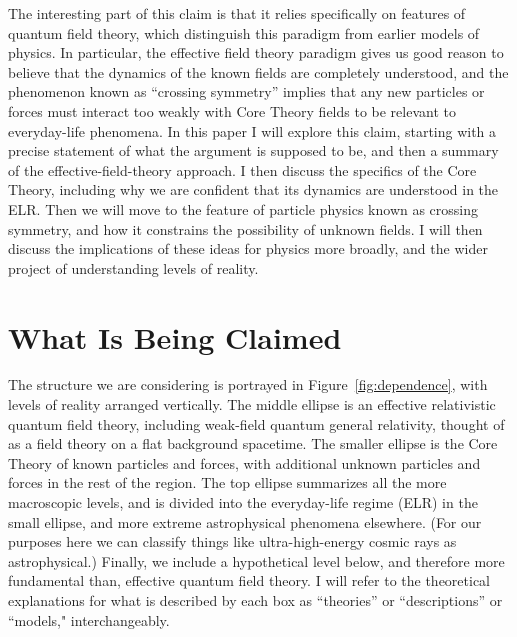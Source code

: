 \documentclass[12pt,letterpaper]{article}
\begin{document}
 The interesting part of this claim is that it relies specifically on features of quantum field theory, which distinguish this paradigm from earlier models of physics.
 In particular, the effective field theory paradigm gives us good reason to believe that the dynamics of the known fields are completely understood, and the phenomenon known as ``crossing symmetry'' implies that any new particles or forces must interact too weakly with Core Theory fields to be relevant to everyday-life phenomena.
 In this paper I will explore this claim, starting with a precise statement of what the argument is supposed to be, and then a summary of the effective-field-theory approach. 
 I then discuss the specifics of the Core Theory, including why we are confident that its dynamics are understood in the ELR.
Then we will move to the feature of particle physics known as crossing symmetry, and how it constrains the possibility of unknown fields.
 I will then discuss the implications of these ideas for physics more broadly, and the wider project of understanding levels of reality.


\section{What Is Being Claimed}


The structure we are considering is portrayed in Figure~\ref{fig:dependence}, with levels of reality arranged vertically.
The middle ellipse is an effective relativistic quantum field theory, including weak-field quantum general relativity, thought of as a field theory on a flat background spacetime.
The smaller ellipse is the Core Theory of known particles and forces, with additional unknown particles and forces in the rest of the region.
The top ellipse summarizes all the more macroscopic levels, and is divided into the everyday-life regime (ELR) in the small ellipse, and more extreme astrophysical phenomena elsewhere.
(For our purposes here we can classify things like ultra-high-energy cosmic rays as astrophysical.)
Finally, we include a hypothetical level below, and therefore more fundamental than, effective quantum field theory.
I will refer to the theoretical explanations for what is described by each box as ``theories'' or ``descriptions'' or ``models," interchangeably.
\end{document}
